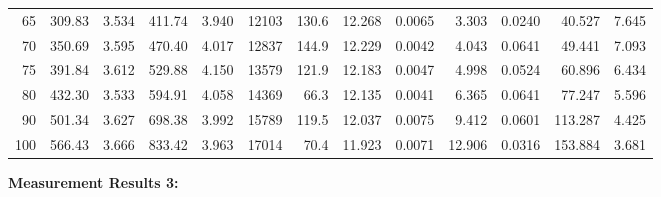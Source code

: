 \documentclass[10pt]{article}
\begin{document}
{\begin{tabular}{|r|rr|rr|rr|rr|rr|r|r|}
       65 &       309.83 &        3.534 &       411.74 &        3.940 &        12103 &        130.6 &       12.268 &       0.0065 &        3.303 &       0.0240 &       40.527 &        7.645 \\
       70 &       350.69 &        3.595 &       470.40 &        4.017 &        12837 &        144.9 &       12.229 &       0.0042 &        4.043 &       0.0641 &       49.441 &        7.093 \\
       75 &       391.84 &        3.612 &       529.88 &        4.150 &        13579 &        121.9 &       12.183 &       0.0047 &        4.998 &       0.0524 &       60.896 &        6.434 \\
       80 &       432.30 &        3.533 &       594.91 &        4.058 &        14369 &         66.3 &       12.135 &       0.0041 &        6.365 &       0.0641 &       77.247 &        5.596 \\
       90 &       501.34 &        3.627 &       698.38 &        3.992 &        15789 &        119.5 &       12.037 &       0.0075 &        9.412 &       0.0601 &      113.287 &        4.425 \\
      100 &       566.43 &        3.666 &       833.42 &        3.963 &        17014 &         70.4 &       11.923 &       0.0071 &       12.906 &       0.0316 &      153.884 &        3.681 \\
\hline
\end{tabular}
}

\vspace{3mm}

\noindent
{\large \bf Measurement Results 3:}
\vspace{3mm}
\end{document}
